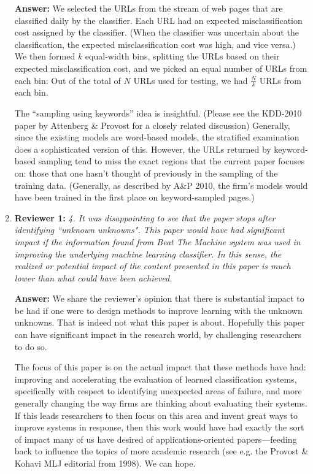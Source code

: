 \documentclass[letterpaper]{article}
\begin{document}
\begin{enumerate}
\textbf{Answer:} We selected the URLs from the stream of web pages that are classified daily by the classifier. Each URL had an expected misclassification cost assigned by the classifier. (When the classifier was uncertain about the classification, the expected misclassification cost was high, and vice versa.) We then formed $k$ equal-width bins, splitting the URLs based on their expected misclassification cost, and we picked an equal number of URLs from each bin: Out of the total of $N$ URLs used for testing, we had  $\frac{N}{k}$ URLs from each bin.  

The ``sampling using keywords'' idea is insightful.  (Please see the KDD-2010 paper by Attenberg \& Provost for a closely related discussion)   Generally, since the existing models are word-based models, the stratified examination does a sophisticated version of this.  However, the URLs returned by keyword-based sampling tend to miss the exact regions that the current paper focuses on: those that one hasn't thought of previously in the sampling of the training data.  (Generally, as described by A\&P 2010, the firm's models would have been trained in the first place on keyword-sampled pages.)  

\item \textbf{Reviewer 1:} \emph{ 4. It was disappointing to see that the paper stops after identifying ``unknown unknowns". This paper would have had significant impact  if the information found from Beat The Machine system was used in improving the underlying machine learning classifier.  In this sense, the realized or potential impact of the content presented in this paper is much lower than what could have been achieved.}

\textbf{Answer:} We share the reviewer's opinion that there is substantial impact to be had if one were to design methods to improve learning with the unknown unknowns.  That is indeed not what this paper is about.  Hopefully this paper can have significant impact in the research world, by challenging researchers to do so.  

The focus of this paper is on the actual impact that these methods have had: improving and accelerating the evaluation of learned classification systems, specifically with respect to identifying unexpected areas of failure, and more generally changing the way firms are thinking about evaluating their systems.  If this leads researchers to then focus on this area and invent great ways to improve systems in response, then this work would have had exactly the sort of impact many of us have desired of applications-oriented papers---feeding back to influence the topics of more academic research (see e.g. the Provost \& Kohavi MLJ editorial from 1998).  We can hope.


\end{enumerate}
\end{document}
